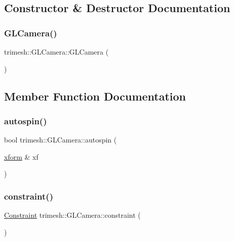 \subsection{Constructor \& Destructor Documentation}
\mbox{\label{classtrimesh_1_1GLCamera_a6c39c60c735a62c606550d8ca60616bd}} 
\subsubsection{\texorpdfstring{G\+L\+Camera()}{GLCamera()}}
{\footnotesize\ttfamily trimesh\+::\+G\+L\+Camera\+::\+G\+L\+Camera (\begin{DoxyParamCaption}{ }\end{DoxyParamCaption})\hspace{0.3cm}{\ttfamily [inline]}}



\subsection{Member Function Documentation}
\mbox{\label{classtrimesh_1_1GLCamera_aba8d85a19802c9c24fa478aa09738b2f}} 
\subsubsection{\texorpdfstring{autospin()}{autospin()}}
{\footnotesize\ttfamily bool trimesh\+::\+G\+L\+Camera\+::autospin (\begin{DoxyParamCaption}\item[{\hyperlink{namespacetrimesh_ad504958f2f56e393991b848986a8459f}{xform} \&}]{xf }\end{DoxyParamCaption})}

\mbox{\label{classtrimesh_1_1GLCamera_a726490d3604bcef7e54c7fbbde20379e}} 
\subsubsection{\texorpdfstring{constraint()}{constraint()}}
{\footnotesize\ttfamily \hyperlink{classtrimesh_1_1GLCamera_a4b7300c68956c148f6f8b014217faed9}{Constraint} trimesh\+::\+G\+L\+Camera\+::constraint (\begin{DoxyParamCaption}{ }\end{DoxyParamCaption})\hspace{0.3cm}{\ttfamily [inline]}}

